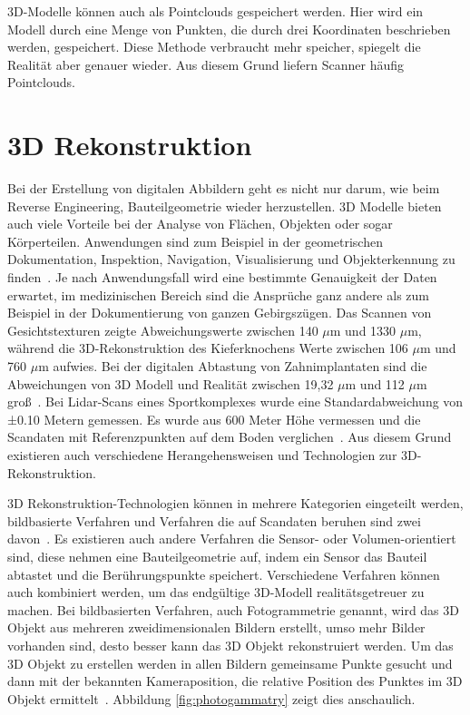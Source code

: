 3D-Modelle können auch als Pointclouds gespeichert werden. Hier wird 
ein Modell durch eine Menge von Punkten, die durch drei Koordinaten beschrieben werden, 
gespeichert.
Diese Methode verbraucht mehr speicher, spiegelt die Realität aber genauer wieder.
Aus diesem Grund liefern Scanner häufig Pointclouds.~\cite{linsen2001point}

\section{3D Rekonstruktion} \label{3d_construction}

Bei der Erstellung von digitalen Abbildern geht es nicht nur darum, wie beim Reverse
Engineering, Bauteilgeometrie wieder herzustellen. 3D Modelle bieten auch viele 
Vorteile bei der Analyse von Flächen, Objekten oder sogar Körperteilen. 
Anwendungen sind zum Beispiel in der
geometrischen Dokumentation, Inspektion, Navigation, Visualisierung und 
Objekterkennung zu finden~\cite{Verykokou.2023}. Je nach Anwendungsfall wird eine
bestimmte Genauigkeit
der Daten erwartet, im medizinischen Bereich sind die Ansprüche ganz 
andere als zum Beispiel in der Dokumentierung von ganzen Gebirgszügen.
Das Scannen von Gesichtstexturen zeigte Abweichungswerte zwischen 140 $\mu$m und 
1330 $\mu$m, während die 3D-Rekonstruktion des Kieferknochens Werte zwischen 106 $\mu$m 
und 760 $\mu$m aufwies. 
Bei der digitalen Abtastung von Zahnimplantaten sind die Abweichungen von 
3D Modell und Realität zwischen 19,32 $\mu$m
und 112 $\mu$m groß~\cite{Bohner.2019}.
Bei Lidar-Scans eines Sportkomplexes wurde eine Standardabweichung von ±0.10 Metern
gemessen. Es wurde aus 600 Meter Höhe vermessen und die Scandaten mit 
Referenzpunkten auf dem Boden verglichen~\cite{Elaksher.2023}.
Aus diesem Grund existieren auch verschiedene Herangehensweisen und Technologien  
zur 3D-Rekonstruktion.

3D Rekonstruktion-Technologien können in mehrere Kategorien eingeteilt werden,
bildbasierte Verfahren und  Verfahren die auf Scandaten 
beruhen sind zwei davon~\cite{Verykokou.2023}.
Es existieren auch andere Verfahren die Sensor- oder Volumen-orientiert sind, 
diese nehmen eine Bauteilgeometrie auf, indem ein Sensor das Bauteil abtastet 
und die Berührungspunkte speichert.
Verschiedene Verfahren können auch kombiniert werden, um das endgültige 3D-Modell
realitätsgetreuer zu machen.
Bei bildbasierten Verfahren, auch Fotogrammetrie genannt, wird das 3D Objekt aus
mehreren zweidimensionalen Bildern erstellt, 
umso mehr Bilder vorhanden sind, desto besser kann das
3D Objekt rekonstruiert werden. Um das 3D Objekt zu erstellen werden in 
allen Bildern gemeinsame Punkte gesucht und dann mit der bekannten Kameraposition, 
die relative Position des Punktes im 3D Objekt ermittelt~\cite{schenk2005introduction}.
Abbildung \ref{fig:photogammatry} zeigt dies anschaulich.

